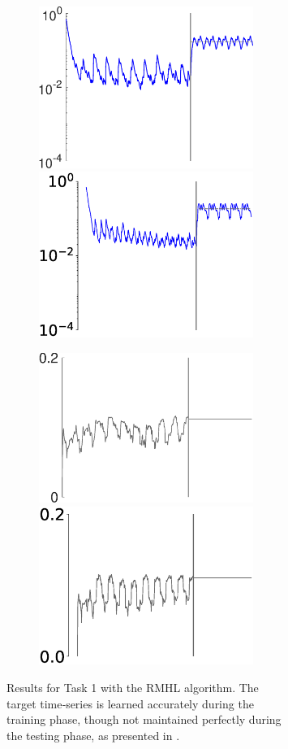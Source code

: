\begin{figure}
\begin{subfigure}{\textwidth}
        
        
        \textbf{}\begin{subfigure}{\textwidth}
        \centering
        
        \includegraphics[height=0.12\linewidth,width=.45\linewidth]{Figures/Fig_T1/MATLAB/RHML_T1_MSE.eps}
        \includegraphics[height=0.12\linewidth,width=.45\linewidth]{Figures/Fig_T1/Python/RHML_T1_MSE.eps}
        
        \end{subfigure}
        
        
        \textbf{}\begin{subfigure}{\textwidth}
        \centering
        
        \includegraphics[trim=0cm 0cm 1cm 0cm, clip=true,height=0.12\linewidth,width=.45\linewidth]{Figures/Fig_T1/MATLAB/RHML_T1_W_norm.eps}
        \hspace{.3em}
        \includegraphics[trim=0cm 0cm 1cm 0cm, clip=true,height=0.12\linewidth,width=.45\linewidth]{Figures/Fig_T1/Python/RHML_T1_W_norm.eps}
        
        \end{subfigure}
        
    \caption{Results for Task 1 with the RMHL algorithm. The target time‐series is learned accurately during the training phase, though not maintained perfectly during the testing phase, as presented in \cite{pyle2019}.}
    \label{Fig:compTask1RMHL_MSE}
    \end{subfigure}
    
    \begin{subfigure}{\textwidth}
        \centering
        

\end{subfigure}
\end{figure}
